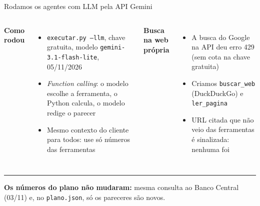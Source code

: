 \documentclass[aspectratio=169,11pt]{beamer}
\begin{document}
\begin{frame}{Rodamos os agentes com LLM pela API Gemini}
\small
\begin{columns}[T]
\textbf{Como rodou}
\begin{itemize}
  \item \texttt{executar.py --llm}, chave gratuita, modelo \texttt{gemini-3.1-flash-lite}, 05/11/2026
  \item \textit{Function calling}: o modelo escolhe a ferramenta, o Python calcula, o modelo redige o parecer
  \item Mesmo contexto do cliente para todos: use só números das ferramentas
\end{itemize}
\textbf{Busca na web própria}
\begin{itemize}
  \item A busca do Google na API deu erro 429 (sem cota na chave gratuita)
  \item Criamos \texttt{buscar\_web} (DuckDuckGo) e \texttt{ler\_pagina}
  \item URL citada que não veio das ferramentas é sinalizada: nenhuma foi
\end{itemize}
\end{columns}
\vspace{2mm}
\hrule\vspace{2mm}
\textbf{Os números do plano não mudaram:} mesma consulta ao Banco Central (03/11) e, no \texttt{plano.json}, só os pareceres são novos.
\end{frame}
\end{document}
